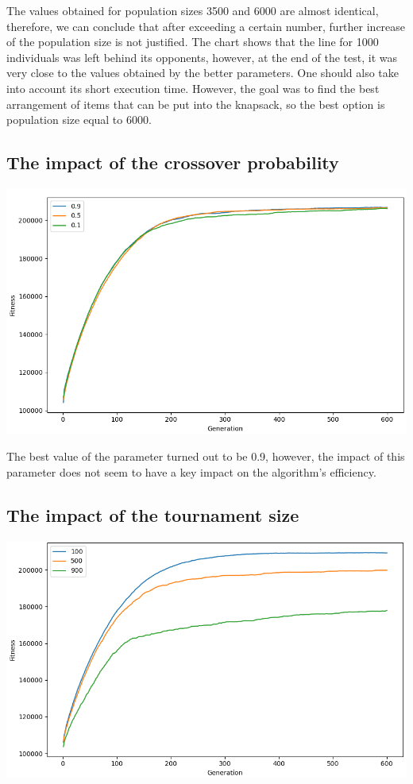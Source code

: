 \documentclass[12pt]{article}
\begin{document}
The values obtained for population sizes 3500 and 6000 are almost identical, therefore, we can conclude that after exceeding a certain number, further increase of the population size is not justified. The chart shows that the line for 1000 individuals was left behind its opponents, however, at the end of the test, it was very close to the values obtained by the better parameters. One should also take into account its short execution time. However, the goal was to find the best arrangement of items that can be put into the knapsack, so the best option is population size equal to 6000.

\subsection{The impact of the crossover probability}
\hspace*{-1.5cm}
\includegraphics[scale=0.55]{crossover}

The best value of the parameter turned out to be 0.9, however, the impact of this parameter does not seem to have a key impact on the algorithm's efficiency.

\subsection{The impact of the tournament size}
\hspace*{-1.5cm}
\includegraphics[scale=0.55]{tournament}
\end{document}
